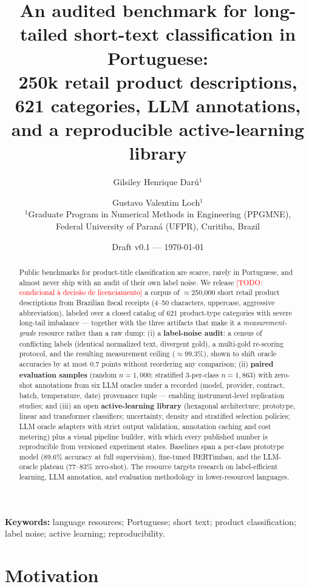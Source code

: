 \documentclass[11pt]{article}
\title{An audited benchmark for long-tailed short-text classification in
Portuguese:\\ 250k retail product descriptions, 621 categories, LLM
annotations, and a reproducible active-learning library}
\author{Gilsiley Henrique Darú$^{1}$ \and Gustavo Valentim Loch$^{1}$\\[2pt]
\normalsize $^{1}$Graduate Program in Numerical Methods in Engineering (PPGMNE),\\
\normalsize Federal University of Paraná (UFPR), Curitiba, Brazil}
\date{Draft v0.1 --- \today}
\newcommand{\todo}[1]{\textcolor{red}{[TODO: #1]}}
\begin{document}
\maketitle

\begin{abstract}
Public benchmarks for product-title classification are scarce, rarely in
Portuguese, and almost never ship with an audit of their own label
noise. We release \todo{condicional à decisão de licenciamento} a corpus
of $\approx$250{,}000 short retail product descriptions from Brazilian
fiscal receipts (4--50 characters, uppercase, aggressive abbreviation),
labeled over a closed catalog of 621 product-type categories with severe
long-tail imbalance --- together with the three artifacts that make it a
\emph{measurement-grade} resource rather than a raw dump: (i) a
\textbf{label-noise audit}: a census of conflicting labels (identical
normalized text, divergent gold), a multi-gold re-scoring protocol, and
the resulting measurement ceiling ($\approx$99.3\%), shown to shift
oracle accuracies by at most 0.7 points without reordering any
comparison; (ii) \textbf{paired evaluation samples} (random $n=1{,}000$;
stratified 3-per-class $n=1{,}863$) with zero-shot annotations from six
LLM oracles under a recorded (model, provider, contract, batch,
temperature, date) provenance tuple --- enabling instrument-level
replication studies; and (iii) an open \textbf{active-learning library}
(hexagonal architecture; prototype, linear and transformer classifiers;
uncertainty, density and stratified selection policies; LLM oracle
adapters with strict output validation, annotation caching and cost
metering) plus a visual pipeline builder, with which every published
number is reproducible from versioned experiment states. Baselines span
a per-class prototype model (89.6\% accuracy at full supervision),
fine-tuned BERTimbau, and the LLM-oracle plateau (77--83\% zero-shot).
The resource targets research on label-efficient learning, LLM
annotation, and evaluation methodology in lower-resourced languages.
\end{abstract}

\noindent\textbf{Keywords:} language resources; Portuguese; short text;
product classification; label noise; active learning; reproducibility.

\section{Motivation}
\label{sec:motivation}
\end{document}
